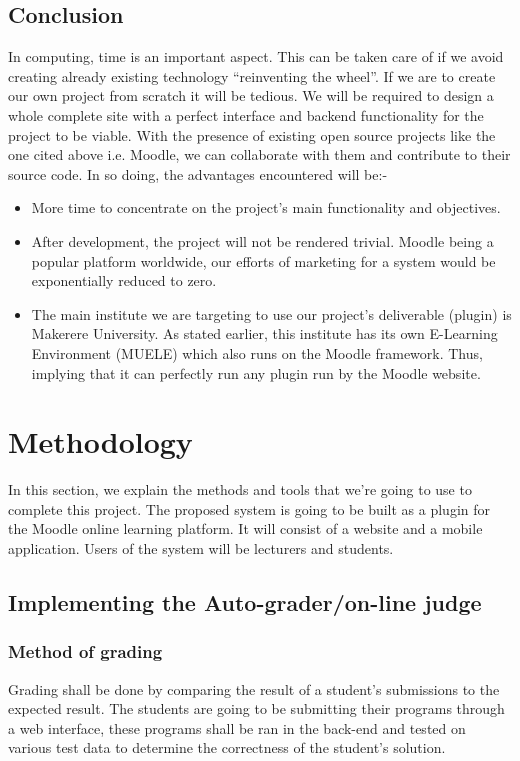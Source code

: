 \documentclass[12pt]{article}
\begin{document}
	\subsection{Conclusion}
	In computing, time is an important aspect. This can be taken care of if we avoid creating already existing technology 			“reinventing the wheel”. If we are to create our own project from scratch it will be tedious. We will be required to design a 		whole complete site with a perfect interface and backend functionality for the project to be viable. With the presence of 		existing open source projects like the one cited above i.e. Moodle, we can collaborate with them and contribute to their 			source code. In so doing, the advantages encountered will be:- 
	 \begin{itemize}
			\item More time to concentrate on the project’s main functionality and objectives.
			\item 	After development, the project will not be rendered trivial. Moodle being a popular platform 							worldwide, our efforts of marketing for a system would be exponentially reduced to zero.
			\item	The main institute we are targeting to use our project’s deliverable (plugin) is Makerere University. As 					stated earlier, this institute has its own E-Learning Environment (MUELE) which also runs on the 						Moodle framework. Thus, implying that it can perfectly run any plugin run by the Moodle website.
		\end{itemize}

\newpage

\section{Methodology}
	In this section, we explain the methods and tools that we're going to use to complete this project. The proposed system is going to be built as a plugin for the Moodle online learning platform. It will consist of a website and a mobile application. Users of the system will be lecturers and students.
	\subsection{Implementing the Auto-grader/on-line judge}
		\subsubsection{Method of grading}
		Grading shall be done by comparing the result of a student's submissions to the expected result. The students are going to be submitting their programs through a web interface, these programs shall be ran in the back-end and tested on various test data to determine the correctness of the student's solution. 
		
\end{document}
